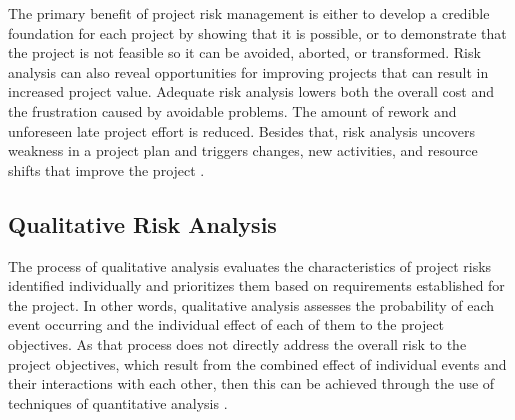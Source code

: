 The primary benefit of project risk management is either to develop a credible foundation for each project by showing that it is possible, or to demonstrate that the project is not feasible so it can be avoided, aborted, or transformed. Risk analysis can also reveal opportunities for improving projects that can result in increased project value. Adequate risk analysis lowers both the overall cost and the frustration caused by avoidable problems. The amount of rework and unforeseen late project effort is reduced. Besides that, risk analysis uncovers weakness in a project plan and triggers changes, new activities, and resource shifts that improve the project \cite{kendrick2003identifying}.

\subsection{Qualitative Risk Analysis}

The process of qualitative analysis evaluates the characteristics of project risks identified individually and prioritizes them based on requirements established for the project. In other words, qualitative analysis assesses the probability of each event occurring and the individual effect of each of them to the project objectives. As that process does not directly address the overall risk to the project objectives, which result from the combined effect of individual events and their interactions with each other, then this can be achieved through the use of techniques of quantitative analysis \cite{PRACTICESTANDARD2009}.

